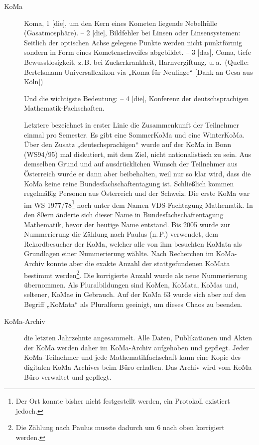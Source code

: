 \documentclass{neulingsheft}
\begin{document}
{\begin{description}
\item[KoMa] Koma, 1 [die], um den Kern eines Kometen liegende Nebelhülle
	(Gasatmosphäre). – 2 [die], Bildfehler bei Linsen oder Linsensystemen:
	Seitlich der optischen Achse gelegene Punkte werden nicht punktförmig
	sondern in Form eines Kometenschweifes abgebildet. – 3 [das], Coma, tiefe
	Bewusstlosigkeit, z.\,B. bei Zuckerkrankheit, Harnvergiftung, u.\,a.\
	(Quelle: Bertelsmann Universallexikon via „Koma für Neulinge“ [Dank an Gesa
	aus Köln])

	Und die wichtigste Bedeutung: – 4 [die], Konferenz der deutschsprachigen
	Mathematik-Fachschaften.

	Letztere bezeichnet in erster Linie die Zusammenkunft der Teilnehmer einmal
	pro Semester. Es gibt eine SommerKoMa und eine WinterKoMa. Über den Zusatz
	„deutschsprachigen“ wurde auf der KoMa in Bonn (WS94/95) mal diskutiert,
	mit dem Ziel, nicht nationalistisch zu sein. Aus demselben Grund und auf
	ausdrücklichen Wunsch der Teilnehmer aus Österreich wurde er dann aber
	beibehalten, weil nur so klar wird, dass die KoMa keine reine
	Bundesfachschaftentagung ist. Schließlich kommen regelmäßig Personen aus
	Österreich und der Schweiz. Die erste KoMa war im WS 1977/78\footnote{Der
	Ort konnte bisher nicht festgestellt werden, ein Protokoll existiert
	jedoch.} noch unter dem Namen VDS-Fachtagung Mathematik. In den 80ern
	änderte sich dieser Name in Bundesfachschaftentagung Mathematik, bevor der
	heutige Name entstand.  Bis 2005 wurde zur Nummerierung die Zählung nach
	Paulus (n.\,P.) verwendet, dem Rekordbesucher der KoMa, welcher alle von
	ihm besuchten KoMata als Grundlagen einer Nummerierung wählte. Nach
	Recherchen im KoMa-Archiv konnte aber die exakte Anzahl der stattgefundenen
	KoMata bestimmt werden\footnote{Die Zählung nach Paulus musste dadurch um 6
	nach oben korrigiert werden.}. Die korrigierte Anzahl wurde als neue
	Nummerierung übernommen.  Als Pluralbildungen sind KoMen, KoMata, KoMas
	und, seltener, KoMae in Gebrauch. Auf der KoMa 63 wurde sich aber auf den
	Begriff „KoMata“ als Pluralform geeinigt, um dieses Chaos zu beenden.

\item[KoMa-Archiv] %
	die letzten Jahrzehnte angesammelt. Alle Daten, Publikationen und Akten der
	KoMa werden daher im KoMa-Archiv aufgehoben und gepflegt.  Jeder
	KoMa-Teilnehmer und jede Mathematikfachschaft kann eine Kopie des digitalen
	KoMa-Archives beim Büro erhalten. Das Archiv wird vom KoMa-Büro verwaltet
	und gepflegt.


\end{description}}
\end{document}
